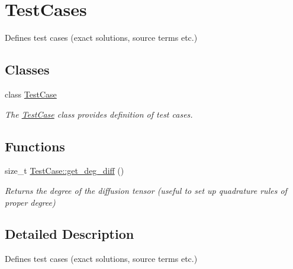 \hypertarget{group__TestCases}{}\section{Test\+Cases}
\label{group__TestCases}


Defines test cases (exact solutions, source terms etc.)  


\subsection*{Classes}
\begin{DoxyCompactItemize}
\item 
class \hyperlink{classTestCase}{Test\+Case}
\begin{DoxyCompactList}\small\item\em The \hyperlink{classTestCase}{Test\+Case} class provides definition of test cases. \end{DoxyCompactList}\end{DoxyCompactItemize}
\subsection*{Functions}
\begin{DoxyCompactItemize}
\item 
\mbox{\label{group__TestCases_ga3dd2daaebb012281b252ab65db0045b2}} 
size\+\_\+t \hyperlink{group__TestCases_ga3dd2daaebb012281b252ab65db0045b2}{Test\+Case\+::get\+\_\+deg\+\_\+diff} ()
\begin{DoxyCompactList}\small\item\em Returns the degree of the diffusion tensor (useful to set up quadrature rules of proper degree) \end{DoxyCompactList}\end{DoxyCompactItemize}


\subsection{Detailed Description}
Defines test cases (exact solutions, source terms etc.) 

